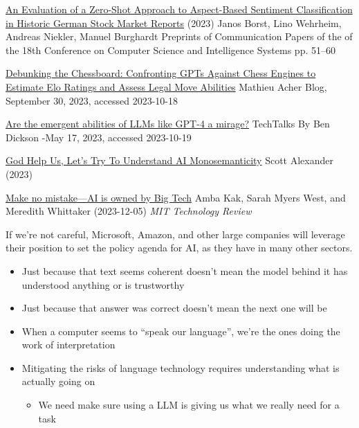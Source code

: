 \documentclass[25pt,a4paper,landscape,headrule,footrule,xetex]{foils}
\let\oldbibliography
\renewcommand{}[1]{
  \begingroup
  \renewcommand{\section}[2]{} %
  \oldbibliography{#1} %
  \endgroup
}
\begin{document}
\href{https://annals-csis.org/proceedings/2023/pliks/3725.pdf}{An Evaluation of a Zero-Shot Approach to
Aspect-Based Sentiment Classification in Historic
German Stock Market Reports} (2023) Janos Borst, Lino Wehrheim, Andreas Niekler, Manuel Burghardt
Preprints of Communication Papers of the of the 18th Conference on Computer
Science and Intelligence Systems pp. 51–60

\href{https://blog.mathieuacher.com/GPTsChessEloRatingLegalMoves/}{Debunking the Chessboard: Confronting GPTs Against Chess Engines to Estimate Elo Ratings and Assess Legal Move Abilities} 
Mathieu Acher Blog, September 30, 2023, accessed 2023-10-18

\href{https://bdtechtalks.com/2023/05/17/llm-emergent-abilities-mirage/}{Are the emergent abilities of LLMs like GPT-4 a mirage?} TechTalks
By Ben Dickson -May 17, 2023, accessed 2023-10-19

\href{https://www.astralcodexten.com/p/god-help-us-lets-try-to-understand}{God Help Us, Let's Try To Understand AI Monosemanticity} Scott Alexander (2023)

\href{https://www.technologyreview.com/2023/12/05/1084393/make-no-mistake-ai-is-owned-by-big-tech/amp/}{Make no mistake—AI is owned by Big Tech}  Amba Kak, Sarah Myers West, and Meredith Whittaker (2023-12-05) \textit{MIT Technology Review}

If we’re not careful, Microsoft, Amazon, and other large companies will leverage their position to set the policy agenda for AI, as they have in many other sectors.





\begin{itemize}
\item  Just because that text seems coherent doesn’t mean the model behind it has
understood anything or is trustworthy
\item  Just because that answer was correct doesn’t mean the next one will be
\item  When a computer seems to “speak our language”, we’re the ones
doing the work of interpretation
\item Mitigating the risks of language technology requires understanding what is actually going on
  \begin{itemize}
  \item We need make sure using a LLM is giving us what we really need for a task
  \end{itemize}
\end{itemize}




\end{document}
